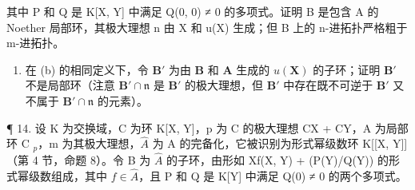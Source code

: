 其中 P 和 Q 是 K{[}X, Y{]} 中满足 Q(0, 0) ≠ 0 的多项式。证明 B 是包含 A 的 Noether 局部环，其极大理想 n 由 X 和 u(X) 生成；但 B 上的 n-进拓扑严格粗于 m-进拓扑。

\begin{enumerate}
\def\labelenumi{(\alph{enumi})}
\setcounter{enumi}{2}
\tightlist
\item
  在 (b) 的相同定义下，令 \(\mathbf{B}'\) 为由 \(\mathbf{B}\) 和 \(\mathbf{A}\) 生成的 \(u(\mathbf{X})\) 的子环；证明 \(\mathbf{B}'\) 不是局部环（注意 \(\mathbf{B}' \cap \mathfrak{n}\) 是 \(\mathbf{B}'\) 的极大理想，但 \(\mathbf{B}'\) 中存在既不可逆于 \(\mathbf{B}'\) 又不属于 \(\mathbf{B}' \cap \mathfrak{n}\) 的元素）。
\end{enumerate}

¶ 14. 设 K 为交换域，C 为环 K{[}X, Y{]}，p 为 C 的极大理想 CX + CY，A 为局部环 C \(_{p}\)，m 为其极大理想，\(\hat{A}\) 为 A 的完备化，它被识别为形式幂级数环 K{[}{[}X, Y{]}{]}（第 4 节，命题 8）。令 B 为 \(\hat{A}\) 的子环，由形如 Xf(X, Y) + (P(Y)/Q(Y)) 的形式幂级数组成，其中 \(f \in \hat{A}\)，且 P 和 Q 是 K{[}Y{]} 中满足 Q(0) ≠ 0 的两个多项式。

